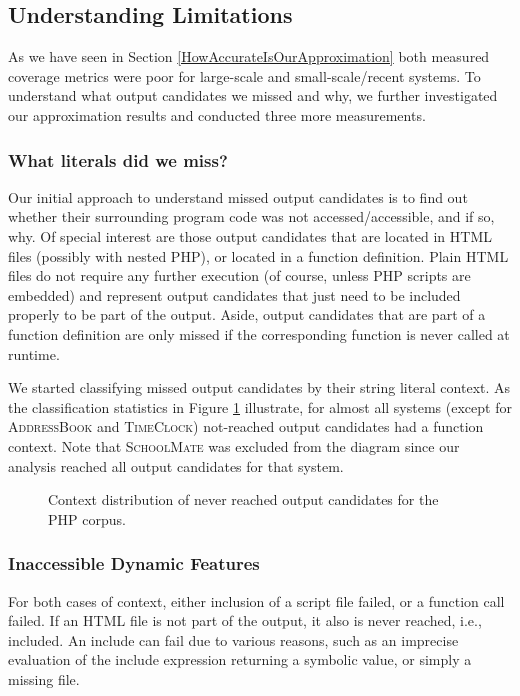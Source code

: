 \documentclass[preprint]{sig-alternate-05-2015}
\begin{document}
\subsection{Understanding Limitations}
As we have seen in Section \ref{HowAccurateIsOurApproximation} both measured coverage metrics were poor for large-scale and small-scale/recent systems. To understand what output candidates we missed and why, we further investigated our approximation results and conducted three more measurements. 

\subsubsection{What literals did we miss?}
\label{WhatLiteralsDidWeMiss?}
Our initial approach to understand missed output candidates is to find out whether their surrounding program code was not accessed/accessible, and if so, why. Of special interest are those output candidates that are located in HTML files (possibly with nested PHP), or located in a function definition. Plain HTML files do not require any further execution (of course, unless PHP scripts are embedded) and represent output candidates that just need to be included properly to be part of the output. Aside, output candidates that are part of a function definition are only missed if the corresponding function is never called at runtime.

We started classifying missed output candidates by their string literal context. As the classification statistics in Figure \ref{fig:contexts} illustrate, for almost all systems (except for \textsc{AddressBook} and \textsc{TimeClock}) not-reached output candidates had a function context. Note that \textsc{SchoolMate} was excluded from the diagram since our analysis reached all output candidates for that system.

\begin{figure}
	\resizebox{0.4\textwidth}{!}{%
		
	}	
	\caption{Context distribution of never reached output candidates for the PHP
	corpus.}
	\label{fig:contexts}
\end{figure}

\subsubsection{Inaccessible Dynamic Features}
\label{sec:inaccessible}
For both cases of context, either inclusion of a script file failed, or a function call failed. If an HTML file is not part of the output, it also is never reached, i.e., included. An include can fail due to various reasons, such as an imprecise evaluation of the include expression returning a symbolic value, or simply a missing file. 
\end{document}
